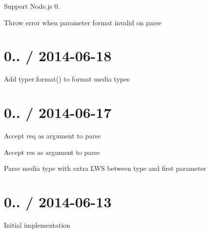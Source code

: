
\begin{DoxyItemize}
\item Support Node.\+js 0.
\item Throw error when parameter format invalid on parse
\end{DoxyItemize}

\section*{0.. / 2014-\/06-\/18 }


\begin{DoxyItemize}
\item Add {\ttfamily typer.\+format()} to format media types
\end{DoxyItemize}

\section*{0.. / 2014-\/06-\/17 }


\begin{DoxyItemize}
\item Accept {\ttfamily req} as argument to {\ttfamily parse}
\item Accept {\ttfamily res} as argument to {\ttfamily parse}
\item Parse media type with extra L\+W\+S between type and first parameter
\end{DoxyItemize}

\section*{0.. / 2014-\/06-\/13 }


\begin{DoxyItemize}
\item Initial implementation 
\end{DoxyItemize}